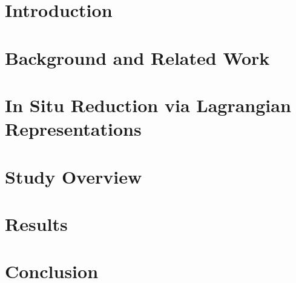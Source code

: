 \section{Introduction}
\label{sec:introduction}


\vspace{-2mm}
\section{Background and Related Work}
\label{sec:related}


\vspace{-2mm}
\section{In Situ Reduction via Lagrangian Representations}
\label{sec:method}


\vspace{-2mm}
\section{Study Overview}
\label{sec:study}


\vspace{-2mm}
\section{Results}
\label{sec:results}


\vspace{-2mm}
\section{Conclusion}
\label{sec:conclusion}

